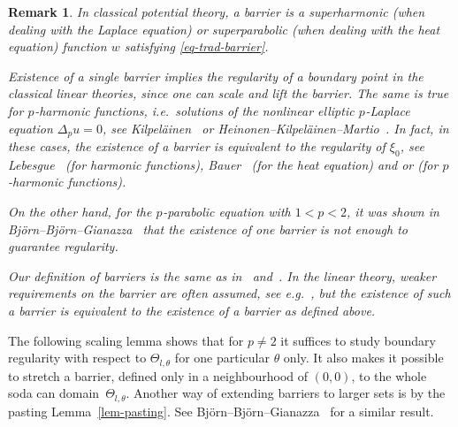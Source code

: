 \documentclass[a4paper, twoside]{article}
\theoremstyle{propositional}
\theoremstyle{descriptive}
\newtheorem{remark}[thm]{Remark}
\numberwithin{equation}{section}
\newcommand{\p}{{$p\mspace{1mu}$}}
\begin{document}
\begin{remark} \label{rmk-trad-barrier}
In classical potential theory,  
a \emph{barrier} is a superharmonic (when dealing with the 
Laplace equation) or superparabolic 
(when dealing with the heat equation) 
function $w$ satisfying \eqref{eq-trad-barrier}.

Existence of a single 
barrier implies the regularity of a 
boundary point in the classical linear theories,
since  one can scale and lift the barrier.
The same is true for \p-harmonic functions, i.e.\ solutions of
the nonlinear elliptic \p-Laplace equation
$\Delta_p u=0$, see 
Kilpel\"ainen~\cite[Theorem~1.5]{Kilp89} or
Heinonen--Kilpel\"ainen--Martio~\cite[Theorem~9.8]{HeKiMa}.
In fact, in these cases,
the existence of a barrier
is \emph{equivalent} to the regularity of $\xi_0$,
see Lebesgue~\cite{Lebesgue24} (for harmonic functions),
Bauer~\cite[Theorems~30 and~31]{Bauer62} (for the heat equation)
and \cite{HeKiMa} or \cite{Kilp89} (for \p-harmonic functions).

On the other hand, for the \p-parabolic equation with $1<p<2$, it was
shown in
Bj\"orn--Bj\"orn--Gianazza~\cite[Proposition~1.2]{BBG}
that the existence of one barrier 
is \emph{not} enough to guarantee regularity.

Our definition of barriers is the
same as in~\cite{Lebesgue24} and~\cite{HeKiMa}.
In the linear theory, 
weaker requirements on the barrier are often assumed,
see e.g.~\cite[Definition~9]{Bauer62},
but the existence of such a barrier is
equivalent to the existence of a barrier as defined above.
\end{remark}


The following scaling lemma shows that for $p\ne2$
it suffices to study boundary regularity 
with respect to $\Theta_{l,\theta}$ for one particular $\theta$ only.
It also makes it possible to stretch a barrier, 
defined only in a neighbourhood of
$(0,0)$, to the whole soda can domain~$\Theta_{l,\theta}$.
Another way of extending barriers to larger sets is by the pasting 
Lemma~\ref{lem-pasting}.
See Bj\"orn--Bj\"orn--Gianazza~\cite[Proposition~4.1]{BBG} for a similar result.
\end{document}
